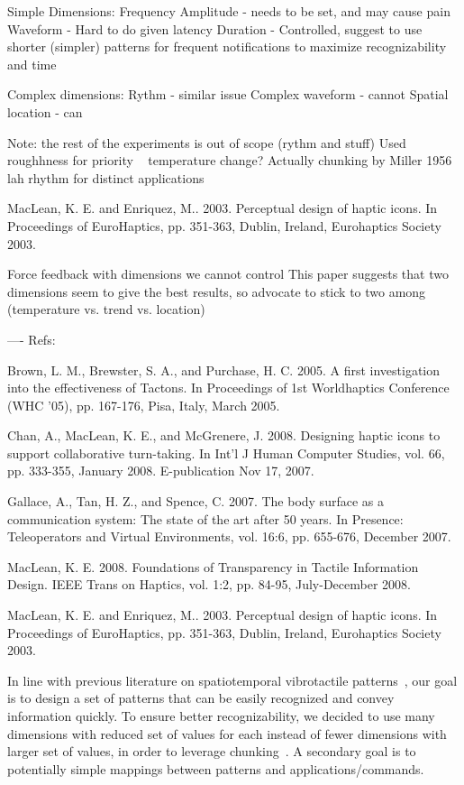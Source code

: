 Simple Dimensions:
Frequency
Amplitude - needs to be set, and may cause pain
Waveform - Hard to do given latency
Duration - Controlled, suggest to use shorter (simpler) patterns for frequent notifications to maximize recognizability and time

Complex dimensions:
Rythm - similar issue
Complex waveform - cannot
Spatial location - can

Note: the rest of the experiments is out of scope (rythm and stuff)
Used roughhness for priority ~ temperature change?
Actually chunking by Miller 1956 lah
rhythm for distinct applications


MacLean, K. E. and Enriquez, M.. 2003. Perceptual design of haptic icons. In Proceedings of EuroHaptics, pp. 351-363, Dublin, Ireland, Eurohaptics Society 2003.

Force feedback with dimensions we cannot control
This paper suggests that two dimensions seem to give the best results, so advocate to stick to two among (temperature vs. trend vs. location)


----
Refs:

Brown, L. M., Brewster, S. A., and Purchase, H. C. 2005. A first investigation into the effectiveness of Tactons. In Proceedings of 1st Worldhaptics Conference (WHC '05), pp. 167-176, Pisa, Italy, March 2005.

Chan, A., MacLean, K. E., and McGrenere, J. 2008. Designing haptic icons to support collaborative turn-taking. In Int'l J Human Computer Studies, vol. 66, pp. 333-355, January 2008. E-publication Nov 17, 2007.

Gallace, A., Tan, H. Z., and Spence, C. 2007. The body surface as a communication system: The state of the art after 50 years. In Presence: Teleoperators and Virtual Environments, vol. 16:6, pp. 655-676, December 2007.

MacLean, K. E. 2008. Foundations of Transparency in Tactile Information Design. IEEE Trans on Haptics, vol. 1:2, pp. 84-95, July-December 2008.

MacLean, K. E. and Enriquez, M.. 2003. Perceptual design of haptic icons. In Proceedings of EuroHaptics, pp. 351-363, Dublin, Ireland, Eurohaptics Society 2003.


In line with previous literature on spatiotemporal vibrotactile patterns~\cite{Alvina2015,Yatani2009}, our goal is to design a set of patterns that can be easily recognized and convey information quickly. To ensure better recognizability, we decided to use many dimensions with reduced set of values for each instead of fewer dimensions with larger set of values, in order to leverage chunking~\cite{Miller1956}.
A secondary goal is to potentially simple mappings between patterns and applications/commands.


